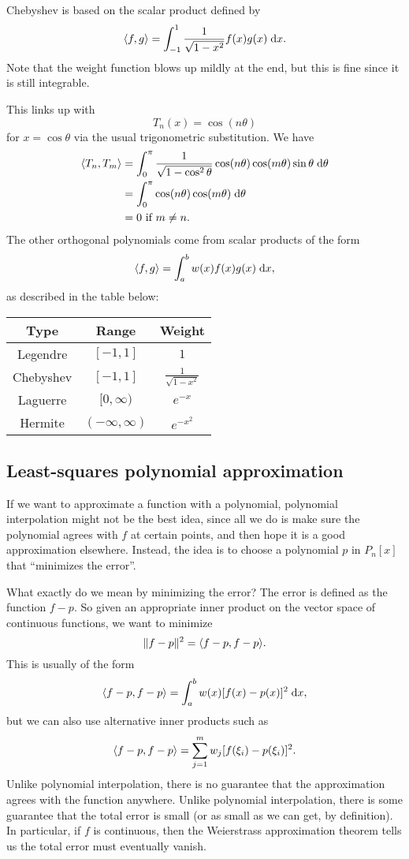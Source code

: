 \documentclass[a4paper]{article}
\begin{document}
Chebyshev is based on the scalar product defined by
\[
  \langle f, g\rangle = \int_{-1}^1 \frac{1}{\sqrt{1 - x^2}} f(x) g(x)\;\mathrm{d} x.
\]
Note that the weight function blows up mildly at the end, but this is fine since it is still integrable.

This links up with
\[
  T_n (x) = \cos(n\theta)
\]
for $x = \cos \theta$ via the usual trigonometric substitution. We have
\begin{align*}
  \langle T_n, T_m \rangle &= \int_0^\pi \frac{1}{\sqrt{1 - \cos^2 \theta}} \cos(n\theta) \cos (m\theta) \sin \theta \;\mathrm{d} \theta\\
  &= \int_0^\pi \cos(n\theta) \cos (m\theta)\;\mathrm{d} \theta\\
  &= 0\text{ if }m\not= n.
\end{align*}
The other orthogonal polynomials come from scalar products of the form
\[
  \langle f, g\rangle = \int_a^b w(x) f(x) g(x)\;\mathrm{d} x,
\]
as described in the table below:
\begin{center}
  \begin{tabular}{ccc}
    \toprule
    Type & Range & Weight\\
    \midrule
    Legendre & $[-1, 1]$ & $1$\\
    Chebyshev & $[-1, 1]$ & $\frac{1}{\sqrt{1 - x^2}}$\\
    Laguerre & $[0, \infty)$ & $e^{-x}$\\
    Hermite & $(-\infty, \infty)$ & $e^{-x^2}$\\
    \bottomrule
  \end{tabular}
\end{center}
\subsection{Least-squares polynomial approximation}
If we want to approximate a function with a polynomial, polynomial interpolation might not be the best idea, since all we do is make sure the polynomial agrees with $f$ at certain points, and then hope it is a good approximation elsewhere. Instead, the idea is to choose a polynomial $p$ in $P_n[x]$ that ``minimizes the error''.

What exactly do we mean by minimizing the error? The error is defined as the function $f - p$. So given an appropriate inner product on the vector space of continuous functions, we want to minimize
\[
  \|f - p\|^2 = \langle f - p, f - p\rangle.
\]
This is usually of the form
\[
  \langle f - p, f - p\rangle = \int_a^b w(x) [f(x) - p(x)]^2 \;\mathrm{d} x,
\]
but we can also use alternative inner products such as
\[
  \langle f - p, f - p\rangle = \sum_{j = 1}^m w_j [f(\xi_i) - p(\xi_i)]^2.
\]
Unlike polynomial interpolation, there is no guarantee that the approximation agrees with the function anywhere. Unlike polynomial interpolation, there is some guarantee that the total error is small (or as small as we can get, by definition). In particular, if $f$ is continuous, then the Weierstrass approximation theorem tells us the total error must eventually vanish.
\end{document}
